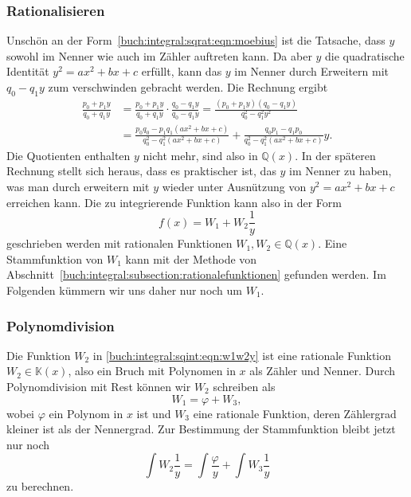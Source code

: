 \subsubsection{Rationalisieren}
Unschön an der Form~\eqref{buch:integral:sqrat:eqn:moebius} ist die
Tatsache, dass $y$ sowohl im Nenner wie auch im Zähler auftreten kann.
Da aber $y$ die quadratische Identität $y^2=ax^2+bx+c$ erfüllt,
kann das $y$ im Nenner durch Erweitern mit $q_0-q_1y$ zum verschwinden
gebracht werden.
Die Rechnung ergibt
\begin{align*}
\frac{p_0+p_1y}{q_0+q_1y}
&=
\frac{p_0+p_1y}{q_0+q_1y}
\cdot
\frac{q_0-q_1y}{q_0-q_1y}
=
\frac{(p_0+p_1y)(q_0-q_1y)}{q_0^2-q_1^2y^2}
\\
&=
\frac{p_0q_0-p_1q_1(ax^2+bx+c)}{q_0^2-q_1^2(ax^2+bx+c)}
+
\frac{q_0p_1-q_1p_0}{q_0^2-q_1^2(ax^2+bx+c)} y.
\end{align*}
Die Quotienten enthalten $y$ nicht mehr, sind also in $\mathbb{Q}(x)$.
In der späteren Rechnung stellt sich heraus, dass es praktischer ist,
das $y$ im Nenner zu haben, was man durch erweitern mit $y$ wieder
unter Ausnützung von $y^2=ax^2+bx+c$ erreichen kann.
Die zu integrierende Funktion  kann also in der Form
\begin{equation}
f(x)
=
W_1 + W_2\frac{1}{y}
\label{buch:integral:sqint:eqn:w1w2y}
\end{equation}
geschrieben werden mit rationalen Funktionen
$W_1,W_2\in\mathbb{Q}(x)$.
Eine Stammfunktion von $W_1$ kann mit der Methode von
Abschnitt~\ref{buch:integral:subsection:rationalefunktionen}
gefunden werden.
Im Folgenden kümmern wir uns daher nur noch um $W_1$.

%
%
\subsubsection{Polynomdivision}
Die Funktion $W_2$ in \eqref{buch:integral:sqint:eqn:w1w2y} ist eine
rationale Funktion $W_2\in \mathbb{K}(x)$, also ein Bruch mit Polynomen
in $x$ als Zähler und Nenner.
Durch Polynomdivision mit Rest können wir $W_2$ schreiben als
\[
W_1 = \varphi + W_3,
\]
wobei $\varphi$ ein Polynom in $x$ ist und $W_3$ eine rationale
Funktion, deren Zählergrad kleiner ist als der Nennergrad.
Zur Bestimmung der Stammfunktion bleibt jetzt nur noch
\begin{equation}
\int W_2\frac{1}{y}
=
\int \frac{\varphi}{y} 
+
\int W_3\frac1{y}
\label{buch:integral:sqint:eqn:Wy}
\end{equation}
zu berechnen.

